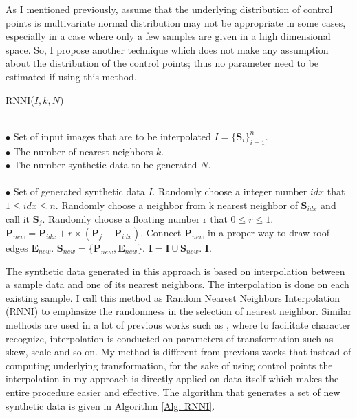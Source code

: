 \documentclass{iitthesis}
\begin{document}
As I mentioned previously, assume that the underlying distribution of control points is multivariate normal distribution may not be appropriate in some cases, especially in a case where only a few samples are given in a high dimensional space. So, I propose another technique which does not make any assumption about the distribution of the control points; thus no parameter need to be estimated if using this method. 

{\linespread{1.5}
\begin{algorithm}[htb]  
\small
 	\caption{ RNNI($I, k, N$)}   
	\label{Alg: RNNI}    
	\begin{algorithmic}[1]  		
	\REQUIRE ~~\\ 
		$\bullet$ Set of input images that are to be interpolated $I=\{\textbf{S}_i\}_{i=1}^n$. \\ 
		$\bullet$ The number of nearest neighbors $k$. \\ 	
		$\bullet$ The number synthetic data to be generated $N$. \\
	\ENSURE ~~\\
		$\bullet$ Set of generated synthetic data $I$. 	
	\STATE Randomly choose a integer number $idx$ that $1\leq idx \leq n$. 	
	\STATE Randomly choose a neighbor from k nearest neighbor of $\textbf{S}_{idx}$ and call it $\textbf{S}_j$.
	\STATE Randomly choose a floating number r that $0\leq r \leq 1$.	
	\STATE $\textbf{P}_{new}=\textbf{P}_{idx}+r\times(\textbf{P}_j-\textbf{P}_{idx})$.
	\STATE Connect $\textbf{P}_{new}$ in a proper way to draw roof edges $\textbf{E}_{new}$.
	\STATE $\textbf{S}_{new}=\{\textbf{P}_{new}, \textbf{E}_{new}\}$.
	\STATE $\textbf{I}=\textbf{I}\cup \textbf{S}_{new}$.
	\ENDFOR 	
	\RETURN \textbf{I}. 	
\end{algorithmic}   
\end{algorithm}  
}

The synthetic data generated in this approach is based on interpolation between a sample data and one of its nearest neighbors. The interpolation is done on each existing sample. I call this method as Random Nearest Neighbors Interpolation (RNNI) to emphasize the randomness in the selection of nearest neighbor. Similar methods are used in a lot of previous works such as \cite{Comput.Sci.&Appl.Math.1997}, where to facilitate character recognize, interpolation is conducted on parameters of transformation such as skew, scale and so on. My method is different from previous works that instead of computing underlying transformation, for the sake of using control points the interpolation in my approach is directly applied on data itself which makes the entire procedure easier and effective. The algorithm that generates a set of new synthetic data is given in Algorithm \ref{Alg: RNNI}.
\end{document}
